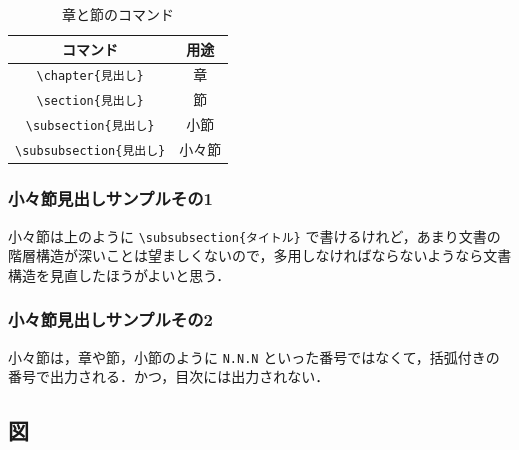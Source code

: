 \begin{table}[htbp]
  \caption{章と節のコマンド}
  \label{tb:chap}
  \begin{center}\begin{tabular}{c|c}
    \hline
    コマンド&用途\\\hline\hline
    \verb|\chapter{見出し}|&章\\\hline
    \verb|\section{見出し}|&節\\\hline
    \verb|\subsection{見出し}|&小節\\\hline
    \verb|\subsubsection{見出し}|&小々節\\\hline
    \end{tabular}\end{center}
\end{table}

\subsubsection{小々節見出しサンプルその1}

小々節は上のように \verb|\subsubsection{タイトル}| で書けるけれど，あまり文書の階層構造が深いことは望ましくないので，多用しなければならないようなら文書構造を見直したほうがよいと思う．

\subsubsection{小々節見出しサンプルその2}

小々節は，章や節，小節のように {\tt N.N.N} といった番号ではなくて，括弧付きの番号で出力される．かつ，目次には出力されない．

\subsection{図}

